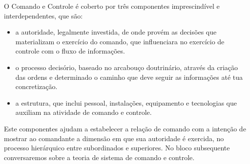 O Comando e Controle é coberto por três componentes  imprescindível e interdependentes, que são:
\begin{itemize}
    \item a autoridade, legalmente investida, de onde provém as decisões que materializam o exercício do comando, que influenciara no exercício de controle com o fluxo de informações.
    \item o processo decisório, baseado no arcabouço doutrinário, através da criação das ordens e determinado o caminho que deve seguir as informações até tua concretização.
    \item a estrutura, que inclui pessoal, instalações, equipamento e tecnologias que auxiliam na atividade de comando e controle.
\end{itemize}
Este componentes ajudam a estabelecer a relação de comando com a intenção de mostrar ao comandante a dimensão em que sua autoridade é exercida, no processo hierárquico entre subordinados e superiores. No bloco subsequente conversaremos sobre a teoria de sistema de comando e controle. 
